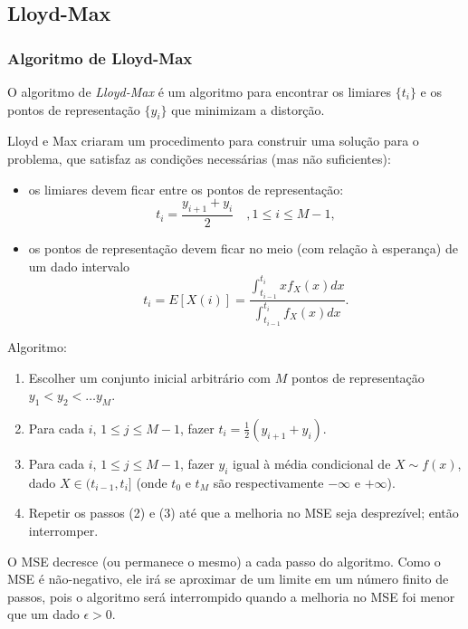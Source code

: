 \subsection{Lloyd-Max}
\begin{frame}[allowframebreaks]
  \frametitle{Algoritmo de Lloyd-Max}
  O algoritmo de \emph{Lloyd-Max} é um algoritmo para encontrar os limiares $\{t_i\}$ e
  os pontos de representação $\{y_i\}$ que minimizam a distorção.

  Lloyd e Max criaram um procedimento para construir uma solução para o problema, que satisfaz
  as condições necessárias (mas não suficientes):

  \begin{itemize}
  \item os limiares devem ficar entre os pontos de representação:
        \begin{equation}
        t_i = \frac{y_{i+1} + y_{i}}{2} \quad , 1 \leq i \leq M-1 , 
        \end{equation}
  \item os pontos de representação devem ficar no meio (com relação à esperança) de um dado intervalo
        \begin{equation}
        t_i = E [ X(i) ] = \frac{ \int_{t_{i-1}}^{t_i} x f_X (x) dx }{ \int_{t_{i-1}}^{t_i} f_X (x) dx  } .
        \end{equation}
  \end{itemize}

  \framebreak
  Algoritmo:
  \begin{enumerate}
  \item Escolher um conjunto inicial arbitrário com $M$ pontos de representação $y_1 < y_2 < \ldots y_M$.
  \item Para cada $i$, $1 \leq j \leq M-1$, fazer $t_i = \frac{1}{2} (y_{i+1} + y_i)$.
  \item Para cada $i$, $1 \leq j \leq M-1$, fazer $y_i$ igual à média condicional de $X \sim f(x)$,
        dado $X \in (t_{i-1}, t_i]$ (onde $t_0$ e $t_M$ são respectivamente $-\infty$ e $+\infty$).
  \item Repetir os passos (2) e (3) até que a melhoria no MSE seja desprezível; então interromper.
  \end{enumerate}
  O MSE decresce (ou permanece o mesmo) a cada passo do algoritmo. Como o MSE é não-negativo,
  ele irá se aproximar de um limite em um número finito de passos, pois o algoritmo será interrompido
  quando a melhoria no MSE foi menor que um dado $\epsilon > 0$.


\end{frame}
